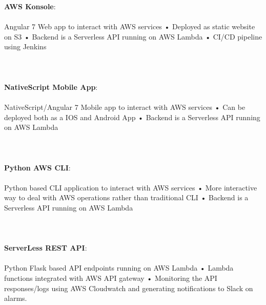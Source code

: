 \documentclass[9pt]{developercv} %
\begin{document}
\begin{minipage}[t]{1\textwidth} %
	\vspace{-\baselineskip} %
	
  \textbf{AWS Konsole}:\\\\Angular 7 Web app to interact with AWS services • Deployed as static website on S3 • Backend is a Serverless API running on AWS Lambda • CI/CD pipeline using Jenkins\\\\ \\\\
\textbf{NativeScript Mobile App}:\\\\NativeScript/Angular 7 Mobile app to interact with AWS services • Can be deployed both as a IOS and Android App • Backend is a Serverless API running on AWS Lambda\\\\\\\\
    \textbf{Python AWS CLI}:\\\\Python based CLI application to interact with AWS services • More interactive way to deal with AWS operations rather than traditional CLI • Backend is a Serverless API running on AWS Lambda\\\\\\\\
        \textbf{ServerLess REST API}:\\\\Python Flask based API endpoints running on AWS Lambda • Lambda functions integrated with AWS API gateway • Monitoring the API responses/logs using AWS Cloudwatch and generating notifications to Slack on alarms.\\\\\\\\

\end{minipage}
\end{document}
